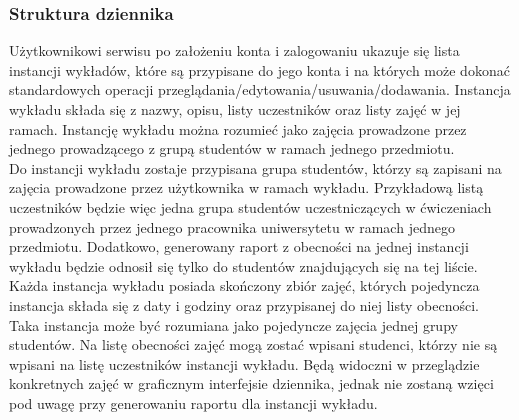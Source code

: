 \documentclass[declaration,shortabstract, mgr]{iithesis}
\begin{document}
\subsubsection{Struktura dziennika}
\indent Użytkownikowi serwisu po założeniu konta i zalogowaniu ukazuje się lista instancji wykładów, które są przypisane do jego konta i na których może dokonać standardowych operacji przeglądania/edytowania/usuwania/dodawania. Instancja wykładu składa się z nazwy, opisu, listy uczestników oraz listy zajęć w jej ramach. Instancję wykładu można  rozumieć jako zajęcia prowadzone przez jednego prowadzącego z grupą studentów w ramach jednego przedmiotu. \\
\indent Do instancji wykładu zostaje przypisana grupa studentów, którzy są zapisani na zajęcia prowadzone przez użytkownika w ramach wykładu. Przykładową listą uczestników będzie więc jedna grupa studentów uczestniczących w ćwiczeniach prowadzonych przez jednego pracownika uniwersytetu w ramach jednego przedmiotu. Dodatkowo, generowany raport z obecności na jednej instancji wykładu będzie odnosił się tylko do studentów znajdujących się na tej liście.\\
\indent Każda instancja wykładu posiada skończony zbiór zajęć, których pojedyncza instancja składa się z daty i godziny oraz przypisanej do niej listy obecności. Taka instancja może być rozumiana jako pojedyncze zajęcia jednej grupy studentów. Na listę obecności zajęć mogą zostać wpisani studenci, którzy nie są wpisani na listę uczestników instancji wykładu. Będą widoczni w przeglądzie konkretnych zajęć w graficznym interfejsie dziennika, jednak nie zostaną wzięci pod uwagę przy generowaniu raportu dla instancji wykładu.\\
\end{document}
